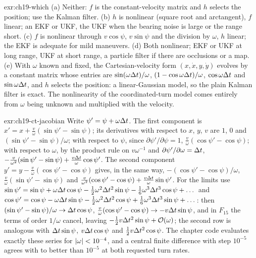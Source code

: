 
\begin{solution}{exr:ch19-which}
(a) Neither: $f$ is the constant-velocity matrix and $h$ selects the position; use the Kalman filter. (b) $h$ is nonlinear (square root and arctangent), $f$ linear; an EKF or UKF, the UKF when the bearing noise is large or the range short. (c) $f$ is nonlinear through $v\cos\psi$, $v\sin\psi$ and the division by $\omega$, $h$ linear; the EKF is adequate for mild maneuvers. (d) Both nonlinear; EKF or UKF at long range, UKF at short range, a particle filter if there are occlusions or a map. (e) With $\omega$ known and fixed, the Cartesian-velocity form $(x, \dot{x}, y, \dot{y})$ evolves by a constant matrix whose entries are $\sin(\omega\Delta t)/\omega$, $(1 - \cos\omega\Delta t)/\omega$, $\cos\omega\Delta t$ and $\sin\omega\Delta t$, and $h$ selects the position: a linear-Gaussian model, so the plain Kalman filter is exact. The nonlinearity of the coordinated-turn model comes entirely from $\omega$ being unknown and multiplied with the velocity.
\end{solution}

\begin{solution}{exr:ch19-ct-jacobian}
Write $\psi' = \psi + \omega\Delta t$. The first component is $x' = x + \frac{v}{\omega}(\sin\psi' - \sin\psi)$; its derivatives with respect to $x$, $y$, $v$ are $1$, $0$ and $(\sin\psi' - \sin\psi)/\omega$; with respect to $\psi$, since $\partial\psi'/\partial\psi = 1$, $\frac{v}{\omega}(\cos\psi' - \cos\psi)$; with respect to $\omega$, by the product rule on $v\omega^{-1}$ and $\partial\psi'/\partial\omega = \Delta t$, $-\frac{v}{\omega^2}(\sin\psi' - \sin\psi) + \frac{v\Delta t}{\omega}\cos\psi'$. The second component $y' = y - \frac{v}{\omega}(\cos\psi' - \cos\psi)$ gives, in the same way, $-(\cos\psi' - \cos\psi)/\omega$, $\frac{v}{\omega}(\sin\psi' - \sin\psi)$ and $\frac{v}{\omega^2}(\cos\psi' - \cos\psi) + \frac{v\Delta t}{\omega}\sin\psi'$. For the limits use $\sin\psi' = \sin\psi + \omega\Delta t\cos\psi - \tfrac12\omega^2\Delta t^2\sin\psi - \tfrac16\omega^3\Delta t^3\cos\psi + \dots$ and $\cos\psi' = \cos\psi - \omega\Delta t\sin\psi - \tfrac12\omega^2\Delta t^2\cos\psi + \tfrac16\omega^3\Delta t^3\sin\psi + \dots$: then $(\sin\psi' - \sin\psi)/\omega \to \Delta t\cos\psi$, $\frac{v}{\omega}(\cos\psi' - \cos\psi) \to -v\Delta t\sin\psi$, and in $F_{15}$ the terms of order $1/\omega$ cancel, leaving $-\tfrac12 v\Delta t^2\sin\psi + \mathcal{O}\!\left(\omega\right)$; the second row is analogous with $\Delta t\sin\psi$, $v\Delta t\cos\psi$ and $\tfrac12 v\Delta t^2\cos\psi$. The chapter code evaluates exactly these series for $\left\lvert \omega \right\rvert < 10^{-4}$, and a central finite difference with step $10^{-5}$ agrees with  to better than $10^{-5}$ at both requested turn rates.
\end{solution}

